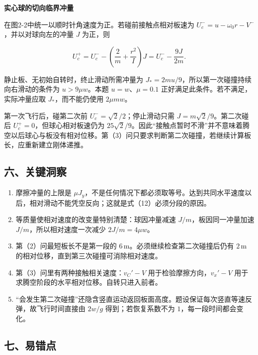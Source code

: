 \documentclass[12pt,a4paper,UTF8]{ctexart}
\newcommand{\tightlist}{\setlength{\itemsep}{0pt}\setlength{\parskip}{0pt}}
\begin{document}
\textbf{实心球的切向临界冲量}

在图2-2中统一以顺时针角速度为正。若碰前接触点相对板速为
\(U_c^-=u-\omega_0r-V^-\)，并以对球向左的冲量 \(J\) 为正，则

\[U_c^+=U_c^- -\left(\frac2m+\frac{r^2}{I}\right)J
=U_c^- -\frac{9J}{2m}.\]

静止板、无初始自转时，终止滑动所需冲量为
\(J_*=2mu/9\)，所以第一次碰撞持续向右滑动的条件为 \(u>9\mu w\)。本题
\(u=w\)、\(\mu=0.1\) 正好满足此条件。若不满足，实际冲量应取
\(J_*\)，而不能仍使用 \(2\mu mw\)。

第一次飞行后，碰第二次前 \(U_c^-=\sqrt2/2\)；停止滑动只需
\(J=m\sqrt2/9\)。第二次碰后 \(U_c^+=0\)，但球心相对板速仍为
\(25\sqrt2/9\)。因此``接触点暂时不滑''并不意味着腾空以后球心与板没有相对位移。第（3）问只要求判断第二次碰撞，若继续计算板长，应重新建立刚体递推。

\subsection{六、关键洞察}\label{ux516dux5173ux952eux6d1eux5bdf-1}

\begin{enumerate}
\def\labelenumi{\arabic{enumi}.}
\tightlist
\item
  摩擦冲量的上限是
  \(\mu J_y\)，不是任何情况下都必须取等号。达到共同水平速度以后，相对滑动不能凭空反向；这就是式（12）必须分段的原因。
\item
  等质量使相对速度的改变量特别清楚：球因冲量减速
  \(J/m\)，板因同一冲量加速 \(J/m\)，所以相对速度一次减少
  \(2J/m=4\mu w\)。
\item
  第（2）问最短板长不是第一段的
  \(6\,\mathrm m\)。必须继续检查第二次碰撞后仍有 \(2\,\mathrm m\)
  的相对位移，直到第三次碰撞可消除相对速度。
\item
  第（3）问里有两种接触相关速度：\(v_C'-V\) 用于检验摩擦方向，\(v_x'-V\)
  用于求腾空阶段的水平相对位移。自转只进入前者。
\item
  ``会发生第二次碰撞''还隐含竖直运动返回板面高度。题设保证每次竖直等速反弹，故飞行时间直接由
  \(2w/g\) 得到；若恢复系数不为 \(1\)，每一段时间都会变化。
\end{enumerate}

\subsection{七、易错点}\label{ux4e03ux6613ux9519ux70b9-1}
\end{document}

